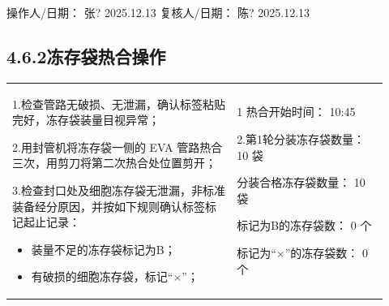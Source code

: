 \documentclass[UTF8,10pt,a4paper,fontset=fandol]{ctexart}
\newcommand{\fieldvalue}[1]{#1}
\newcommand{\handwritten}[1]{#1}
\begin{document}
操作人/日期：
\fieldvalue{\handwritten{张?}}
\quad
\fieldvalue{\handwritten{2025.12.13}}
\qquad
复核人/日期：
\fieldvalue{\handwritten{陈?}}
\quad
\fieldvalue{\handwritten{2025.12.13}}

\subsection*{4.6.2\quad 冻存袋热合操作}

\begin{center}
\small
\begin{tabular}{|p{0.55\linewidth}|p{0.37\linewidth}|}
\hline
\begin{minipage}[t]{\linewidth}
1.检查管路无破损、无泄漏，确认标签粘贴完好，冻存袋装量目视异常；

2.用封管机将冻存袋一侧的 EVA 管路热合三次，用剪刀将第二次热合处位置剪开；

3.检查封口处及细胞冻存袋无泄漏，非标准装备经分原因，并按如下规则确认标签标记起止记录：

\begin{itemize}
\item 装量不足的冻存袋标记为B；
\item 有破损的细胞冻存袋，标记“$\times$”；
\end{itemize}
\end{minipage}
&
\begin{minipage}[t]{\linewidth}
1 热合开始时间：
\fieldvalue{\handwritten{10:45}}

2.第1轮分装冻存袋数量：
\fieldvalue{\handwritten{10}} 袋

分装合格冻存袋数量：
\fieldvalue{\handwritten{10}} 袋

标记为B的冻存袋数：
\fieldvalue{\handwritten{0}} 个

标记为“$\times$”的冻存袋数：
\fieldvalue{\handwritten{0}} 个


\end{minipage}
\end{tabular}
\end{center}
\end{document}
